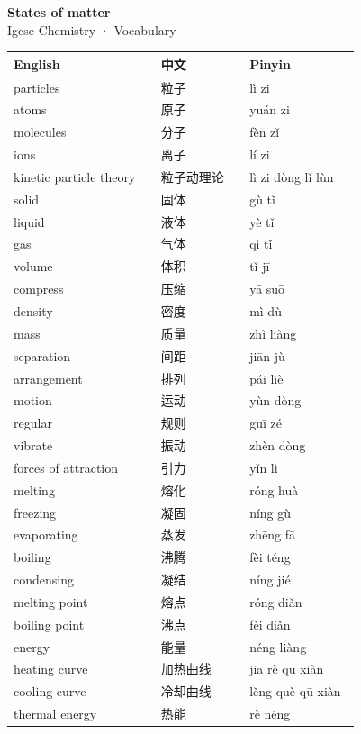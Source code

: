 \documentclass[11pt]{article}
\begin{document}
\begin{center}
  {\LARGE\bfseries States of matter}\\[0.35em]
  {\large Igcse Chemistry · Vocabulary}
\end{center}
\vspace{0.6em}

\begin{longtable}{@{}p{0.40\linewidth}p{0.24\linewidth}p{0.30\linewidth}@{}}
\toprule
\textbf{English} & \textbf{中文} & \textbf{Pinyin} \\
\midrule
\endhead
\bottomrule
\endlastfoot
particles & 粒子 & lì zi \\
atoms & 原子 & yuán zi \\
molecules & 分子 & fèn zǐ \\
ions & 离子 & lí zi \\
kinetic particle theory & 粒子动理论 & lì zi dòng lǐ lùn \\
solid & 固体 & gù tǐ \\
liquid & 液体 & yè tǐ \\
gas & 气体 & qì tǐ \\
volume & 体积 & tǐ jī \\
compress & 压缩 & yā suō \\
density & 密度 & mì dù \\
mass & 质量 & zhì liàng \\
separation & 间距 & jiān jù \\
arrangement & 排列 & pái liè \\
motion & 运动 & yùn dòng \\
regular & 规则 & guī zé \\
vibrate & 振动 & zhèn dòng \\
forces of attraction & 引力 & yǐn lì \\
melting & 熔化 & róng huà \\
freezing & 凝固 & níng gù \\
evaporating & 蒸发 & zhēng fā \\
boiling & 沸腾 & fèi téng \\
condensing & 凝结 & níng jié \\
melting point & 熔点 & róng diǎn \\
boiling point & 沸点 & fèi diǎn \\
energy & 能量 & néng liàng \\
heating curve & 加热曲线 & jiā rè qū xiàn \\
cooling curve & 冷却曲线 & lěng què qū xiàn \\
thermal energy & 热能 & rè néng \\

\end{longtable}
\end{document}
